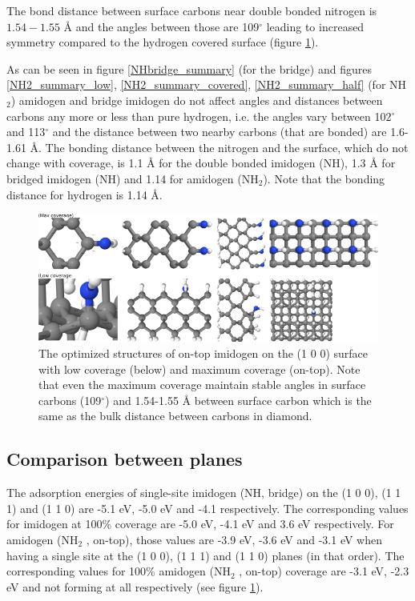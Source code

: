 \documentclass[12pt,a4paper]{article}
\begin{document}
The bond distance between surface carbons near double bonded nitrogen is $1.54-1.55$ Å and the angles between those are 109$^{\circ}$ leading to increased symmetry compared to the hydrogen covered surface (figure \ref{NHdb_summary}).

As can be seen in figure \ref{NHbridge_summary} (for the bridge) and figures \ref{NH2_summary_low},   \ref{NH2_summary_covered}, \ref{NH2_summary_half} (for NH$_2$) amidogen and bridge imidogen do not affect angles and distances between carbons  any more or less than pure hydrogen, i.e. the angles vary between 102$^{\circ}$ and 113$^{\circ}$ and the distance between two nearby carbons (that are bonded) are 1.6-1.61 Å.  The bonding distance between the nitrogen and the surface, which do not change with coverage, is 1.1 Å for the double bonded imidogen (NH), 1.3 Å for bridged imidogen (NH) and 1.14 for amidogen (NH$_2$). Note that the bonding distance for hydrogen is 1.14 Å.

\begin{figure} \captionsetup{width=.8\linewidth} \caption{The optimized structures of on-top imidogen on the (1 0 0) surface with low coverage (below) and maximum coverage (on-top). Note that even the maximum coverage maintain stable angles in surface carbons (109$^{\circ}$) and 1.54-1.55 Å between surface carbon which is the same as the bulk distance between carbons in diamond.} \label{NHdb_summary}
%
\includegraphics[width=.8\linewidth]{pictures/NHdb_summary.png}
\end{figure}



\subsection{Comparison between planes}
The adsorption energies of single-site imidogen (NH, bridge) on the (1 0 0), (1 1 1) and (1 1 0) are -5.1 eV, -5.0 eV and -4.1 respectively. The corresponding values for imidogen at 100\% coverage are -5.0 eV, -4.1 eV and 3.6 eV respectively. For amidogen (NH$_2$ , on-top), those values are -3.9 eV, -3.6 eV and -3.1 eV when having a single site at the (1 0 0), (1 1 1) and (1 1 0) planes (in that order). The corresponding values for 100\% amidogen (NH$_2$ , on-top) coverage are -3.1 eV, -2.3 eV and not forming at all respectively (see figure \ref{NHdb_summary}).



\printbibliography
\end{document}
